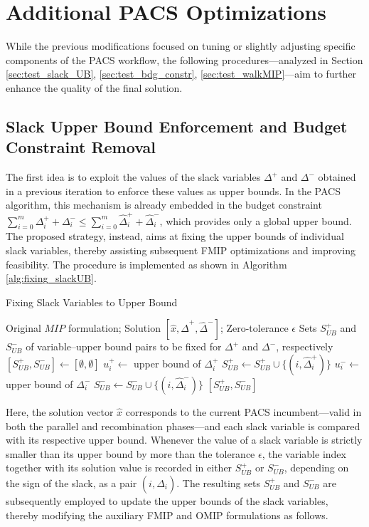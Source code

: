 \section{Additional PACS Optimizations}
While the previous modifications focused on tuning or slightly adjusting specific components of the PACS workflow, the following procedures—analyzed in Section \ref{sec:test_slack_UB}, \ref{sec:test_bdg_constr}, \ref{sec:test_walkMIP}—aim to further enhance the quality of the final solution.

\subsection{Slack Upper Bound Enforcement and Budget Constraint Removal}\label{sec:slack_UB_BDG_constr}
The first idea is to exploit the values of the slack variables $\Delta^+$ and $\Delta^-$ obtained in a previous iteration to enforce these values as upper bounds.  
In the PACS algorithm, this mechanism is already embedded in the budget constraint $\sum_{i=0}^m \Delta_i^{+}+\Delta_i^{-} \le \sum_{i=0}^m \hat\Delta_i^{+}+\hat\Delta_i^{-}$, which provides only a global upper bound. The proposed strategy, instead, aims at fixing the upper bounds of individual slack variables, thereby assisting subsequent FMIP optimizations and improving feasibility.  
The procedure is implemented as shown in Algorithm \ref{alg:fixing_slackUB}.  
\begin{algorithm}[H]
\caption{Fixing Slack Variables to Upper Bound}\label{alg:fixing_slackUB}
\begin{algorithmic}[1]
\Require Original $MIP$ formulation; Solution $[\hat{x}, \hat{\Delta}^+, \hat{\Delta}^-]$; Zero-tolerance $\epsilon$
\Ensure Sets $S_{UB}^+$ and $S_{UB}^-$ of variable–upper bound pairs to be fixed for $\Delta^+$ and $\Delta^-$, respectively
    \State $[S_{UB}^+,S_{UB}^-] \gets [\emptyset,\emptyset]$ 
        \State $u^+_i \gets$ upper bound of $\Delta^+_i$
            \State $S_{UB}^+ \gets S_{UB}^+ \cup \{(i, \hat\Delta^+_i)\}$
        \EndIf
        \State $u^-_i \gets$ upper bound of $\Delta^-_i$
            \State $S_{UB}^- \gets S_{UB}^- \cup \{(i, \hat\Delta^-_i)\}$
        \EndIf
    \EndFor
    \State \Return $[S_{UB}^+, S_{UB}^-]$
\EndFunction
\end{algorithmic}
\end{algorithm}
Here, the solution vector $\hat{x}$ corresponds to the current PACS incumbent---valid in both the parallel and recombination phases---and each slack variable is compared with its respective upper bound. Whenever the value of a slack variable is strictly smaller than its upper bound by more than the tolerance $\epsilon$, the variable index together with its solution value is recorded in either $S_{UB}^+$ or $S_{UB}^-$, depending on the sign of the slack, as a pair $(i, \hat{\Delta}_i)$.
The resulting sets $S_{UB}^+$ and $S_{UB}^-$ are subsequently employed to update the upper bounds of the slack variables, thereby modifying the auxiliary FMIP and OMIP formulations as follows.
